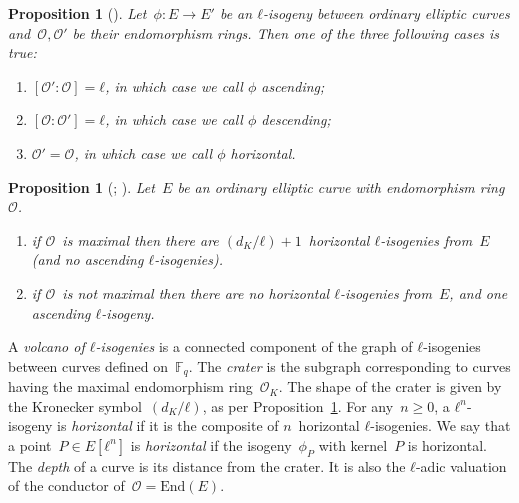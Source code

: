 \documentclass{lms}
\newtheorem{prop}[thm]{Proposition}
\begin{document}
\begin{prop}[{\cite[Proposition~21]{Kohel}}] \label{prop:isogeny-asc-desc}
Let~$ϕ: E → E'$ be an $ℓ$-isogeny between ordinary elliptic curves
and~$\mathcal O, \mathcal O'$ be their endomorphism rings.
Then one of the three following cases is true:
\begin{enumerate}
\item $[\mathcal O':\mathcal O] = ℓ$,
in which case we call $ϕ$ \emph{ascending};
\item $[\mathcal O:\mathcal O'] = ℓ$,
in which case we call $ϕ$ \emph{descending};
\item $\mathcal O' = \mathcal O$,
in which case we call $ϕ$ \emph{horizontal}.
\end{enumerate}
\end{prop}
\begin{prop}[{\cite[Proposition~23]{Kohel}; \cite[Lemma~6]{sutherland2013isogeny}}] \label{prop:isogeny-count}
Let~$E$ be an ordinary elliptic curve with endomorphism ring~$\mathcal O$.
\begin{enumerate}
\item if $\mathcal O$~is maximal then
there are $(d_K/ℓ)+1$~horizontal $ℓ$-isogenies from~$E$
(and no ascending $ℓ$-isogenies).
\item if $\mathcal O$~is not maximal then
there are no horizontal $ℓ$-isogenies from~$E$,
and one ascending $ℓ$-isogeny.
\end{enumerate}
\end{prop}

A \emph{volcano of $ℓ$-isogenies} is a connected component
of the graph of $ℓ$-isogenies between curves defined on~$\mathbb F_q$.
The \emph{crater} is the subgraph corresponding to curves
having the maximal endomorphism ring~$\mathcal O_K$.
The shape of the crater is given by the Kronecker symbol~$(d_K/ℓ)$,
as per Proposition~\ref{prop:isogeny-count}.
For any~$n ≥ 0$, a $ℓ^n$-isogeny is \emph{horizontal}
if it is the composite of $n$~horizontal $ℓ$-isogenies.
We say that a point~$P ∈ E[ℓ^n]$ is \emph{horizontal}
if the isogeny~$ϕ_P$ with kernel~$P$ is horizontal.
The \emph{depth} of a curve is its distance from the crater.
It is also the $ℓ$-adic valuation of the conductor
of~$\mathcal O = \mathrm{End}(E)$.
\end{document}
